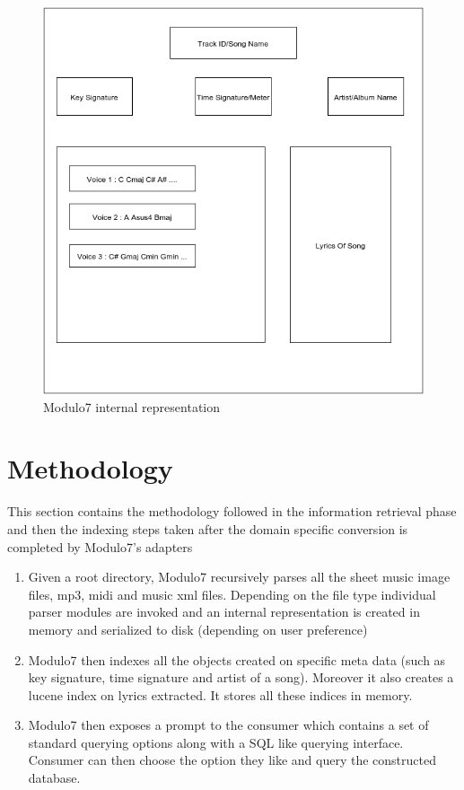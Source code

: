 \begin{figure}
\centering
\includegraphics[width=\textwidth]{DocumentStructureOfModulo7.png}
\makeatletter
\let\@currsize\normalsize
\caption{Modulo7 internal representation}
\label{fig:figureDocStruct}
\end{figure}

\section{Methodology}

\noindent This section contains the methodology followed in the information retrieval phase and then the indexing steps taken after the domain specific conversion is completed by Modulo7's adapters

\begin{enumerate}
\item Given a root directory, Modulo7 recursively parses all the sheet music image files, mp3, midi and music xml files. Depending on the file type individual parser modules are invoked and an internal representation is created in memory and serialized to disk (depending on user preference)
\item Modulo7 then indexes all the objects created on specific meta data (such as key signature, time signature and artist of a song). Moreover it also creates a lucene index on lyrics extracted. It stores all these indices in memory. 
\item Modulo7 then exposes a prompt to the consumer which contains a set of standard querying options along with a SQL like querying interface. Consumer can then choose the option they like and query the constructed database.
\end{enumerate}

